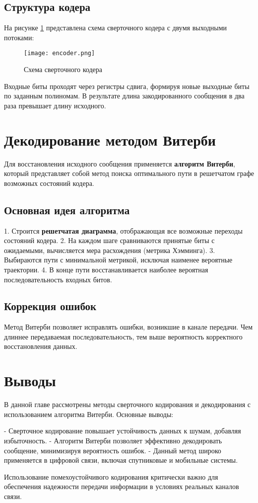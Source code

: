 \subsection{Структура кодера}

На рисунке \ref{fig:encoder} представлена схема сверточного кодера с двумя выходными потоками:

\begin{figure}[h]
    \centering
    \texttt{[image: encoder.png]}
    \caption{Схема сверточного кодера}
    \label{fig:encoder}
\end{figure}

Входные биты проходят через регистры сдвига, формируя новые выходные биты по заданным полиномам. В результате длина закодированного сообщения в два раза превышает длину исходного.

\section{Декодирование методом Витерби}

Для восстановления исходного сообщения применяется \textbf{алгоритм Витерби}, который представляет собой метод поиска оптимального пути в решетчатом графе возможных состояний кодера.

\subsection{Основная идея алгоритма}

1. Строится \textbf{решетчатая диаграмма}, отображающая все возможные переходы состояний кодера.
2. На каждом шаге сравниваются принятые биты с ожидаемыми, вычисляется мера расхождения (метрика Хэмминга).
3. Выбираются пути с минимальной метрикой, исключая наименее вероятные траектории.
4. В конце пути восстанавливается наиболее вероятная последовательность входных битов.

\subsection{Коррекция ошибок}

Метод Витерби позволяет исправлять ошибки, возникшие в канале передачи. Чем длиннее передаваемая последовательность, тем выше вероятность корректного восстановления данных.

\section{Выводы}

В данной главе рассмотрены методы сверточного кодирования и декодирования с использованием алгоритма Витерби. Основные выводы:

- Сверточное кодирование повышает устойчивость данных к шумам, добавляя избыточность.
- Алгоритм Витерби позволяет эффективно декодировать сообщение, минимизируя вероятность ошибок.
- Данный метод широко применяется в цифровой связи, включая спутниковые и мобильные системы.

Использование помехоустойчивого кодирования критически важно для обеспечения надежности передачи информации в условиях реальных каналов связи.


